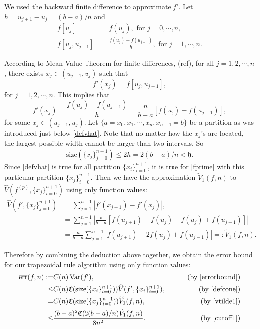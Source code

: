 \documentclass{iitthesis}
\DeclareMathOperator{\Var}{Var}
\theoremstyle{definition}
\theoremstyle{remark}
\begin{document}

We used the backward finite difference to approximate $f'$. Let $h=u_{j+1}-u_{j}=(b-a)/n$ and
\begin{align*}
  f[u_{j}]&=f(u_{j}), \text{ for } j=0,\cdots, n,\\
  f[u_{j},u_{j-1}]&=\frac{f(u_{j})-f(u_{j-1})}{h},\text{ for } j=1, \cdots, n.
\end{align*}


According to Mean Value Theorem for finite differences, (ref), for all $j=1,2,\cdots,n$, there exists $x_j\in (u_{j-1},u_{j})$ such that
\begin{equation*}
   f'(x_j)= f[u_{j},u_{j-1}],
\end{equation*}
for $j = 1, 2, \cdots, n.$ This implies that
\begin{equation}\label{fprime}
  f'(x_j)=\frac{f(u_{j})-f(u_{j-1})}{h}=\frac{n}{b-a}[f(u_{j})-f(u_{j-1})],
\end{equation}
for some $x_j\in (u_{j-1},u_{j})$. Let $\{a=x_{0}, x_{1},\cdots,x_{n},x_{n+1}=b\}$ be a partition as was introduced just below \eqref{defvhat}. Note that no matter how the $x_j$'s are located, the largest possible width cannot be larger than two intervals. So
\begin{equation}\label{cutoff1}
  \text{size}(\{x_j\}_{j=0}^{n+1})\leq 2h=2(b-a)/n<\mathfrak{h}.
\end{equation}
Since \eqref{defvhat} is true for all partition $\{x_i\}_{i=0}^{n+1}$, it is true for \eqref{fprime} with this particular partition $\{x_j\}_{i=0}^{n+1}$. Then we have the approximation $\widetilde{V}_1(f,n)$ to $\widehat{V}(f^{(p)},\{x_j\}_{i=0}^{n+1})$ using only function values:
\begin{align}\label{vtilde1}
\nonumber    \widehat{V}(f',\{x_j\}_{j=0}^{n+1})&= \sum_{j=1}^{n-1}\left|f'(x_{j+1})-f'(x_{j})\right|,\\
\nonumber    &=\sum_{j=1}^{n-1}\left|\frac{n}{b-a}[f(u_{j+1})-f(u_{j})-f(u_{j})+f(u_{j-1})]\right|\\
    &=\frac{n}{b-a}\sum_{j=1}^{n-1}\left|f(u_{j+1})-2f(u_{j})+f(u_{j-1})\right|=:\widetilde{V}_1(f,n).
\end{align}

Therefore by combining the deduction above together, we obtain the error bound for our trapezoidal rule algorithm using only function values:
\begin{align*}
\overline{\text{err}}(f,n):=&C(n)\Var(f'),\qquad &\text{ (by \eqref{errorbound})}\\
\leq & C(n)\mathfrak{C}(\text{size}(\{x_i\}_{i=0}^{n+1}))\widehat{V}(f',\{x_i\}_{i=0}^{n+1}), \qquad &\text{ (by \eqref{defcone})}\\
=& C(n)\mathfrak{C}(\text{size}(\{x_j\}_{i=0}^{n+1}))\widetilde{V}_1(f,n), \qquad &\text{ (by \eqref{vtilde1})}\\
  \leq & \frac{(b-a)^2\mathfrak{C}(2(b-a)/n)\widetilde{V}_1(f,n)}{8n^2}.\qquad &\text{ (by \eqref{cutoff1})}
\end{align*}
\end{document}
